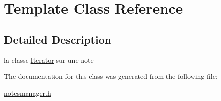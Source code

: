 \hypertarget{class_template}{}\section{Template Class Reference}
\label{class_template}


\subsection{Detailed Description}
la classe \hyperlink{class_iterator}{Iterator} sur une note 

The documentation for this class was generated from the following file\+:\begin{DoxyCompactItemize}
\item 
\hyperlink{notesmanager_8h}{notesmanager.\+h}\end{DoxyCompactItemize}
